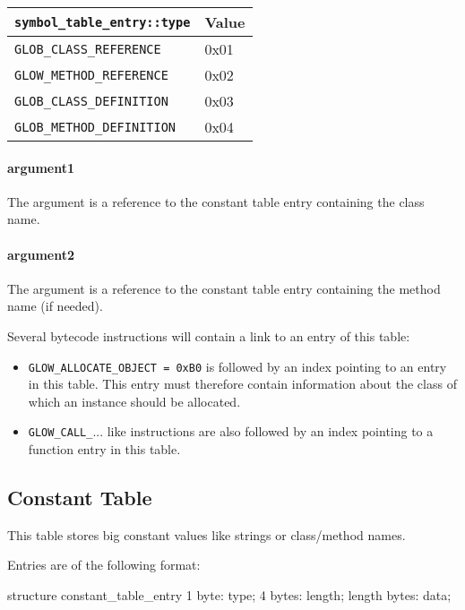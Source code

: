 \documentclass[12pt]{article}
\begin{document}
\begin{tabular}{| l | l |}
\hline
\verb|symbol_table_entry::type| & Value \\
\hline \hline
\verb|GLOB_CLASS_REFERENCE| & 0x01 \\
\hline
\verb|GLOW_METHOD_REFERENCE| & 0x02 \\
\hline
\verb|GLOB_CLASS_DEFINITION| & 0x03 \\
\hline
\verb|GLOB_METHOD_DEFINITION| & 0x04 \\
\hline
\end{tabular}

\paragraph{argument1}
    The argument is a reference to the constant table entry containing the class name.

\paragraph{argument2}
    The argument is a reference to the constant table entry containing the method name (if needed).


Several bytecode instructions will contain a link to an entry of this table:

\begin{itemize}
\item \verb|GLOW_ALLOCATE_OBJECT = 0xB0| is followed by an index pointing to an entry in this
    table. This entry must therefore contain information about the class of which an instance
    should be allocated.
\item \verb|GLOW_CALL_|... like instructions are also followed by an index pointing to a function
    entry in this table.
\end{itemize}

\subsection*{Constant Table}

This table stores big constant values like strings or class/method names.

Entries are of the following format:

\begin{code}[language=C]
structure constant_table_entry {
    1 byte:       type;
    4 bytes:      length;
    length bytes: data;
}
\end{code}
\end{document}
